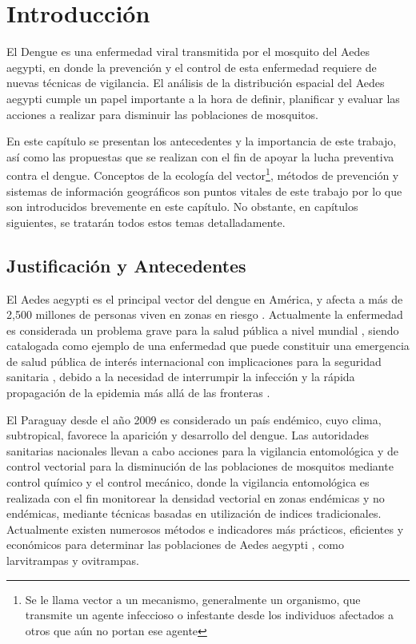 \chapter{Introducción}

El Dengue es una enfermedad viral transmitida por el mosquito del Aedes aegypti, en donde la
prevención y el control de esta enfermedad requiere de nuevas técnicas de vigilancia. El análisis
de la distribución espacial del Aedes aegypti cumple un papel importante a la hora de definir,
planificar y evaluar las acciones a realizar para disminuir las poblaciones de mosquitos.

En este capítulo se presentan los antecedentes y la importancia de este trabajo, así como las
propuestas que se realizan con el fin de apoyar la lucha preventiva contra el dengue. Conceptos de
la ecología del vector\footnote{Se le llama vector a un mecanismo, generalmente un organismo, que
transmite un agente infeccioso o infestante desde los individuos afectados a otros que aún no
portan ese agente}, métodos de prevención y sistemas de información geográficos son puntos
vitales de este trabajo por lo que son introducidos brevemente en este capítulo. No obstante, en
capítulos siguientes, se tratarán todos estos temas detalladamente.

\section{Justificación y Antecedentes}
El Aedes aegypti es el principal vector del dengue en América, y afecta a más de 2,500 millones
de personas viven en zonas en riesgo \cite{world2009dengue, gustavo2006dengue}. Actualmente la enfermedad es considerada un problema grave para la salud pública a nivel mundial
\cite{dengueUruguayCap1, world2009dengue, DIBO2005}, siendo catalogada como ejemplo de una
enfermedad que puede constituir una emergencia de salud pública de interés internacional con
implicaciones para la seguridad sanitaria \cite{dengueUruguayCap1, world2009dengue}, debido a la
necesidad de interrumpir la infección y la rápida propagación de la epidemia más allá de las
fronteras \cite{world2009dengue}.

El Paraguay desde el año 2009 es considerado un país endémico, cuyo clima, subtropical, favorece
la aparición y desarrollo del dengue. Las autoridades sanitarias nacionales llevan a cabo
acciones para la vigilancia entomológica y de control vectorial para la disminución de las
poblaciones de mosquitos mediante control químico y el control mecánico, donde la vigilancia
entomológica es realizada con el fin monitorear la densidad vectorial en zonas endémicas y no
endémicas, mediante técnicas basadas en utilización de indices tradicionales. Actualmente existen
numerosos métodos e indicadores más prácticos, eficientes y económicos para determinar las
poblaciones de Aedes aegypti \cite{cenaprece2013}, como larvitrampas y ovitrampas.

